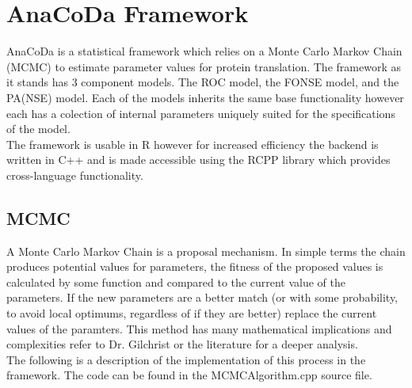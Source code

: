 \documentclass{article}
\begin{document}
\section{AnaCoDa Framework}
AnaCoDa is a statistical framework which relies on a Monte Carlo Markov Chain (MCMC) to estimate parameter values for protein translation.
The framework as it stands has 3 component models. The ROC model, the FONSE model, and the PA(NSE) model. Each of the models inherits the same base
functionality however each has a colection of internal parameters uniquely suited for the specifications of the model.\\
The framework is usable in R however for increased efficiency the backend is written in C++ and is made accessible using the RCPP library which provides cross-language 
functionality.
\subsection{MCMC}
    A Monte Carlo Markov Chain is a proposal mechanism. In simple terms the chain produces potential values for parameters, the fitness of the proposed values is calculated by some function and compared to the current value of the parameters. If the new parameters are a better match (or with some probability, to avoid local optimums, regardless of if they are better) replace the current values of the paramters. This method has many mathematical implications and complexities refer to Dr. Gilchrist or the literature for a deeper analysis.\\
The following is a description of the implementation of this process in the framework. The code can be found in the MCMCAlgorithm.cpp source file.
\end{document}
